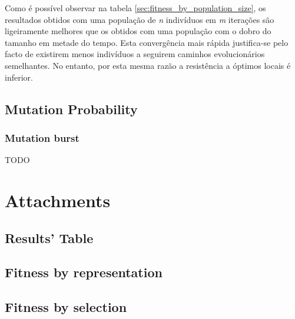 \documentclass[a4paper]{article}
\begin{document}
\indent Como é possível observar na tabela \ref{sec:fitness_by_population_size}, os resultados obtidos com uma
população de \emph{n} indivíduos em \emph{m} iterações são ligeiramente melhores que os obtidos
com uma população com o dobro do tamanho em metade do tempo. Esta convergência mais rápida justifica-se
pelo facto de existirem menos indivíduos a seguirem caminhos evolucionários semelhantes. No entanto, por esta
mesma razão a resistência a óptimos locais é inferior.
 
\cleardoublepage

\subsection{Mutation Probability}
\indent \indent 

\subsubsection{Mutation burst}
\indent \indent TODO %

\cleardoublepage

\eject \pdfpagewidth=594.0mm \pdfpageheight=420.0mm
\paperwidth=594.0mm
\paperheight=420.0mm

\section{Attachments}

\subsection{Results' Table}
\label{sec:results}
\begin{center}
	
\end{center}

\eject \pdfpagewidth=210.0mm \pdfpageheight=297.0mm

\subsection{Fitness by representation}
\label{sec:fitness_by_representation}


\subsection{Fitness by selection}
\label{sec:fitness_by_selection}

\end{document}
